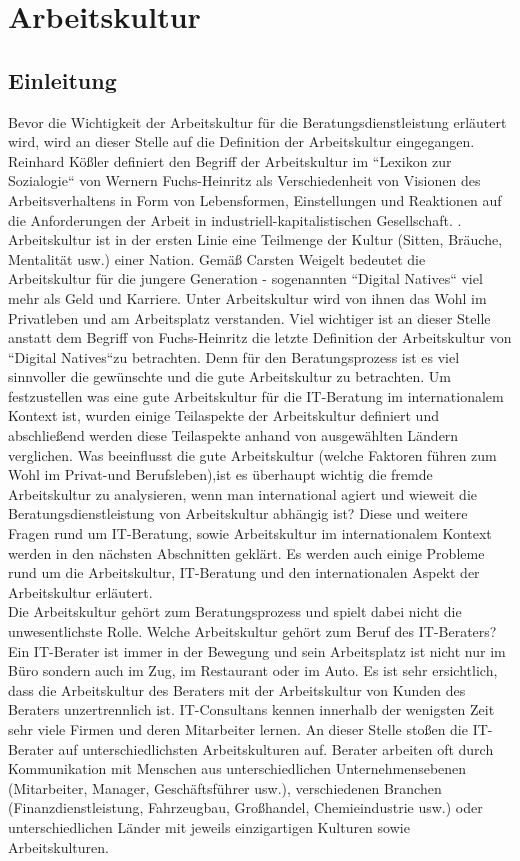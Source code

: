 \section{Arbeitskultur}
	\subsection{Einleitung}
Bevor die Wichtigkeit der Arbeitskultur für die Beratungsdienstleistung erläutert wird, wird an dieser Stelle auf die Definition der Arbeitskultur eingegangen. Reinhard Kößler definiert den Begriff der Arbeitskultur im ``Lexikon zur Sozialogie`` von Wernern Fuchs-Heinritz als Verschiedenheit von Visionen des Arbeitsverhaltens in Form von Lebensformen, Einstellungen und Reaktionen auf die Anforderungen der Arbeit in industriell-kapitalistischen Gesellschaft. \cite{Fuchs-HeinritzLautmannRammstedtWienold1994}.
Arbeitskultur ist in der ersten Linie eine Teilmenge der Kultur (Sitten, Bräuche, Mentalität usw.) einer Nation. Gemäß Carsten Weigelt bedeutet die Arbeitskultur für die jungere Generation - sogenannten ``Digital Natives`` viel mehr als Geld und Karriere. Unter Arbeitskultur wird von ihnen das Wohl im Privatleben und am Arbeitsplatz verstanden.
Viel wichtiger ist an dieser Stelle anstatt dem Begriff von Fuchs-Heinritz die letzte Definition der Arbeitskultur von ``Digital Natives``zu betrachten. Denn für den Beratungsprozess ist es viel sinnvoller die gewünschte und die gute Arbeitskultur zu betrachten. Um festzustellen was eine gute Arbeitskultur für die IT-Beratung im internationalem Kontext ist, wurden einige Teilaspekte der Arbeitskultur definiert und abschließend werden diese Teilaspekte anhand von ausgewählten Ländern verglichen. Was beeinflusst die gute Arbeitskultur (welche Faktoren führen zum Wohl im Privat-und Berufsleben),ist es überhaupt wichtig die fremde Arbeitskultur zu analysieren, wenn man international agiert und wieweit die Beratungsdienstleistung von Arbeitskultur abhängig ist? Diese und weitere Fragen rund um IT-Beratung, sowie Arbeitskultur im internationalem Kontext werden in den nächsten Abschnitten geklärt. Es werden auch einige Probleme rund um die Arbeitskultur, IT-Beratung und den internationalen Aspekt der Arbeitskultur erläutert.\\
Die Arbeitskultur gehört zum Beratungsprozess und spielt dabei nicht die unwesentlichste Rolle. Welche Arbeitskultur gehört zum Beruf des IT-Beraters? Ein IT-Berater ist immer in der Bewegung und sein Arbeitsplatz ist nicht nur im Büro sondern auch im Zug, im Restaurant oder im Auto. Es ist sehr ersichtlich, dass die Arbeitskultur des Beraters mit der Arbeitskultur von Kunden des Beraters unzertrennlich ist. IT-Consultans kennen innerhalb der wenigsten Zeit sehr viele Firmen und deren Mitarbeiter lernen. An dieser Stelle stoßen die IT-Berater auf unterschiedlichsten Arbeitskulturen auf. Berater arbeiten oft durch Kommunikation mit Menschen aus unterschiedlichen Unternehmensebenen (Mitarbeiter, Manager, Geschäftsführer usw.), verschiedenen Branchen (Finanzdienstleistung, Fahrzeugbau, Großhandel, Chemieindustrie usw.) oder unterschiedlichen Länder mit jeweils einzigartigen Kulturen sowie Arbeitskulturen.\\
